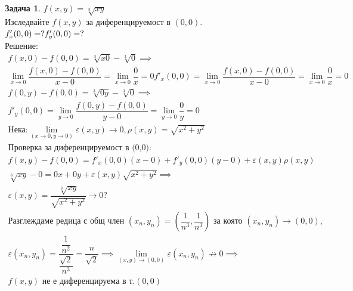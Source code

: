 \documentclass[a4paper,fleqn,12pt]{article}
\theoremstyle{definition}
\newtheorem{task}{Задача}[subsection]
\begin{document}
\begin{task}
$f(x,y) = \sqrt[3]{xy}$\\
Изследвайте $f(x,y)$ за диференцируемост в $(0,0)$.\\
$f'_x (0,0) = ?\\
f'_y (0,0) = ?$ \\
Решение: 
\begin{gather*}
f(x,0) - f(0,0) = \sqrt[3]{x0} - \sqrt[3]{0}\implies \\
\lim\limits_{x \to 0} \dfrac{f(x,0) - f(0,0)}{x - 0} = \lim\limits_{x \to 0} \dfrac{0}{x} = 0
f'_x(0,0) = \lim\limits_{x \to 0} \dfrac{f(x,0) - f(0,0)}{x - 0} =  \lim\limits_{x \to 0} \dfrac{0}{x} = 0\\
f(0,y) - f(0,0) = \sqrt[3]{0y} - \sqrt[3]{0} \implies \\
f'_y(0,0) = \lim\limits_{y \to 0} \dfrac{f(0,y) - f(0,0)}{y - 0} =  \lim\limits_{y \to 0} \dfrac{0}{y} = 0\\
\text{Нека:}
\lim\limits_ {(x \to 0, y \to 0)} \varepsilon (x,y) \to 0, \rho (x,y) = \sqrt{x^2 + y^2}\\
\text{Проверка за диференцируемост в (0,0):}\\
 f(x,y) - f(0,0)  = f'_x(0,0)(x - 0) + f'_y(0,0)(y-0) + \varepsilon (x,y) \rho (x,y) \\
\sqrt[3]{xy} - 0 = 0x + 0y + \varepsilon (x,y)\sqrt{x^2 + y^2} \implies \\
\varepsilon (x,y) = \dfrac{\sqrt[3]{xy}}{\sqrt{x^2 + y^2}} \to 0? \\
\text{Разглеждаме редица с общ член } (x_n, y_n) = \left( \dfrac{1}{n^3}, \dfrac{1}{n^3} \right) \text{ за която } (x_n, y_n) \to (0,0), \\
\varepsilon (x_n, y_n) = \dfrac{\dfrac{1}{n^2}}{\dfrac{\sqrt{2}}{n^3}} = \dfrac{n}{\sqrt{2}} \implies
\lim\limits_ {(x,y) \to (0,0)}\varepsilon(x_n, y_n) \not\to 0 \implies \\
 f(x,y) \text{ не е диференцируема в т.} (0,0)
\end{gather*}
\end{task}
\end{document}
